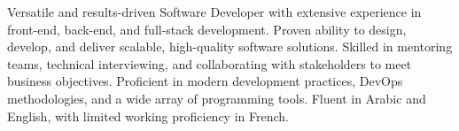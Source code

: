 

\begin{cvparagraph}

Versatile and results-driven Software Developer with extensive
experience in front-end, back-end, and full-stack development.
Proven ability to design, develop, and deliver scalable,
high-quality software solutions.
Skilled in mentoring teams, technical interviewing,
and collaborating with stakeholders to meet business objectives.
Proficient in modern development practices, DevOps methodologies,
and a wide array of programming tools.
Fluent in Arabic and English, with limited working proficiency
in French.
\end{cvparagraph}
